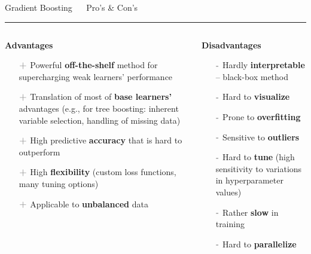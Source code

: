 \documentclass[11pt,compress,t,notes=noshow, xcolor=table]{beamer}
\begin{document}
\LARGE
\begin{frame}{\textcolor{gray!80}{Gradient Boosting} ~~ Pro's \& Con's}
\normalsize
\vspace{-0.5cm}
\noindent \textcolor{gray!80}{\rule{\textwidth}{1pt}}

\vspace{0.3cm}

\footnotesize

\begin{columns}[onlytextwidth]
  \begin{column}{0.5\textwidth}
    \textbf{\textcolor{gray!80}{Advantages}}
    \footnotesize
    \begin{itemize}
      \item[$\textbf{\textcolor{gray!80}{+}}$] Powerful \textbf{off-the-shelf}
      method for supercharging weak learners' performance
      \item[$\textbf{\textcolor{gray!80}{+}}$] Translation of most of 
      \textbf{base learners'} advantages (e.g., for tree boosting: inherent 
      variable selection, handling of missing data)
      \item[$\textbf{\textcolor{gray!80}{+}}$] High predictive
      \textbf{accuracy} that is hard to outperform
      \item[$\textbf{\textcolor{gray!80}{+}}$] High \textbf{flexibility} (custom
      loss functions, many tuning options) 
      \item[$\textbf{\textcolor{gray!80}{+}}$] Applicable to \textbf{unbalanced} 
      data
    \end{itemize}
  \end{column}
  \begin{column}{0.5\textwidth}
    \textbf{\textcolor{gray!80}{Disadvantages}}
    \footnotesize
    \begin{itemize}
      \item[$\textbf{\textcolor{gray!80}{-}}$] Hardly
      \textbf{interpretable} -- black-box method
      \item[$\textbf{\textcolor{gray!80}{-}}$] Hard to \textbf{visualize}
      \item[$\textbf{\textcolor{gray!80}{-}}$] Prone to \textbf{overfitting}
      \item[$\textbf{\textcolor{gray!80}{-}}$] Sensitive to \textbf{outliers}
      \item[$\textbf{\textcolor{gray!80}{-}}$] Hard to \textbf{tune} (high
      sensitivity to variations in hyperparameter values)
      \item[$\textbf{\textcolor{gray!80}{-}}$] Rather \textbf{slow} in training
      \item[$\textbf{\textcolor{gray!80}{-}}$] Hard to \textbf{parallelize}
    \end{itemize}
  \end{column}
\end{columns}

\vfill

\small


\end{frame}
\end{document}
